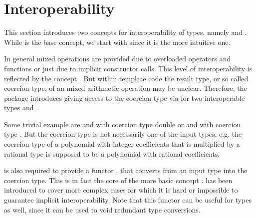 \section{Interoperability}

This section introduces two concepts for interoperability of types, 
namely  and . While 
 is the base concept, we start with 
 since it is the more intuitive one.

In general mixed operations are provided due to overloaded operators and
functions or just due to implicit constructor calls. 
This level of interoperability is reflected by the concept 
. But within template code the result type, 
or so called coercion type, of an mixed arithmetic operation may be unclear.
Therefore, the package introduces 
giving access to the coercion type via 
for two interoperable types  and . 


Some trivial example are  and  with coercion type double 
or  and  with coercion type .
But the coercion type is not necessarily one of the input types,
e.g. the coercion type of a polynomial 
with integer coefficients that is multiplied by a rational type 
is supposed to be a polynomial with rational coefficients.

 is also
required to provide a functor , that 
converts from an input type into the coercion type. This is in fact the core
of the more basic concept . 
 has been introduced to cover more complex cases 
for which it is hard or impossible to guarantee implicit interoperability.  
Note that this functor can be useful for  types 
as well, since it can be used to void redundant type conversions.  

